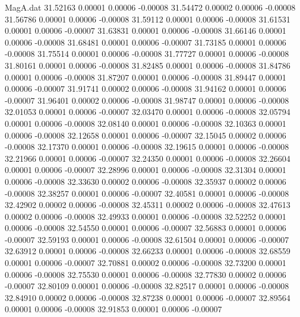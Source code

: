 \begin{filecontents}{MagA.dat}
  31.52163    0.00001    0.00006   -0.00008
  31.54472    0.00002    0.00006   -0.00008
  31.56786    0.00001    0.00006   -0.00008
  31.59112    0.00001    0.00006   -0.00008
  31.61531    0.00001    0.00006   -0.00007
  31.63831    0.00001    0.00006   -0.00008
  31.66146    0.00001    0.00006   -0.00008
  31.68481    0.00001    0.00006   -0.00007
  31.73185    0.00001    0.00006   -0.00008
  31.75514    0.00001    0.00006   -0.00008
  31.77727    0.00001    0.00006   -0.00008
  31.80161    0.00001    0.00006   -0.00008
  31.82485    0.00001    0.00006   -0.00008
  31.84786    0.00001    0.00006   -0.00008
  31.87207    0.00001    0.00006   -0.00008
  31.89447    0.00001    0.00006   -0.00007
  31.91741    0.00002    0.00006   -0.00008
  31.94162    0.00001    0.00006   -0.00007
  31.96401    0.00002    0.00006   -0.00008
  31.98747    0.00001    0.00006   -0.00008
  32.01053    0.00001    0.00006   -0.00007
  32.03470    0.00001    0.00006   -0.00008
  32.05794    0.00001    0.00006   -0.00008
  32.08140    0.00001    0.00006   -0.00008
  32.10363    0.00001    0.00006   -0.00008
  32.12658    0.00001    0.00006   -0.00007
  32.15045    0.00002    0.00006   -0.00008
  32.17370    0.00001    0.00006   -0.00008
  32.19615    0.00001    0.00006   -0.00008
  32.21966    0.00001    0.00006   -0.00007
  32.24350    0.00001    0.00006   -0.00008
  32.26604    0.00001    0.00006   -0.00007
  32.28996    0.00001    0.00006   -0.00008
  32.31304    0.00001    0.00006   -0.00008
  32.33630    0.00002    0.00006   -0.00008
  32.35937    0.00002    0.00006   -0.00008
  32.38257    0.00001    0.00006   -0.00007
  32.40581    0.00001    0.00006   -0.00008
  32.42902    0.00002    0.00006   -0.00008
  32.45311    0.00002    0.00006   -0.00008
  32.47613    0.00002    0.00006   -0.00008
  32.49933    0.00001    0.00006   -0.00008
  32.52252    0.00001    0.00006   -0.00008
  32.54550    0.00001    0.00006   -0.00007
  32.56883    0.00001    0.00006   -0.00007
  32.59193    0.00001    0.00006   -0.00008
  32.61504    0.00001    0.00006   -0.00007
  32.63912    0.00001    0.00006   -0.00008
  32.66233    0.00001    0.00006   -0.00008
  32.68559    0.00001    0.00006   -0.00007
  32.70881    0.00002    0.00006   -0.00008
  32.73200    0.00001    0.00006   -0.00008
  32.75530    0.00001    0.00006   -0.00008
  32.77830    0.00002    0.00006   -0.00007
  32.80109    0.00001    0.00006   -0.00008
  32.82517    0.00001    0.00006   -0.00008
  32.84910    0.00002    0.00006   -0.00008
  32.87238    0.00001    0.00006   -0.00007
  32.89564    0.00001    0.00006   -0.00008
  32.91853    0.00001    0.00006   -0.00007

\end{filecontents}
